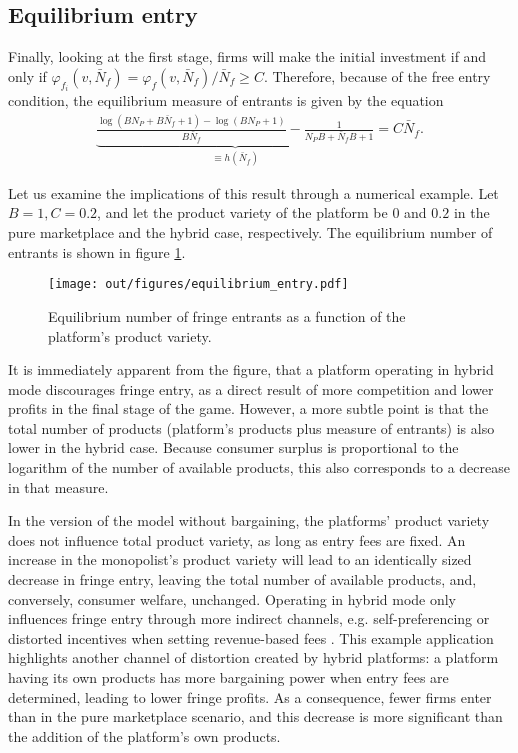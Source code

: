 \documentclass[a4paper]{article}
\begin{document}
\subsection{Equilibrium entry}

Finally, looking at the first stage, firms will make the initial investment if and only if $\varphi_{f_i}(v, \bar{N}_f) = \varphi_f(v, \bar{N}_f) / \bar{N}_f \geq C$. Therefore, because of the free entry condition, the equilibrium measure of entrants is given by the equation
\begin{align*}
    \underbrace{\frac{\log(BN_P + B\bar N_f + 1) - \log(BN_P + 1)}{B\bar N_f} - \frac{1}{N_P B + \bar N_f B + 1}}_{\equiv h(\bar N_f)} = C \bar{N}_f.
\end{align*}

Let us examine the implications of this result through a numerical example. Let $B=1, C=0.2$, and let the product variety of the platform be $0$ and $0.2$ in the pure marketplace and the hybrid case, respectively. The equilibrium number of entrants is shown in figure \ref{fig:entry}.
\begin{figure}
    \centering
    \texttt{[image: out/figures/equilibrium\_entry.pdf]}
    \caption{Equilibrium number of fringe entrants as a function of the platform's product variety.}
    \label{fig:entry}
\end{figure}

It is immediately apparent from the figure, that a platform operating in hybrid mode discourages fringe entry, as a direct result of more competition and lower profits in the final stage of the game. However, a more subtle point is that the total number of products (platform's products plus measure of entrants) is also lower in the hybrid case. Because consumer surplus is proportional to the logarithm of the number of available products, this also corresponds to a decrease in that measure.

 In the version of the model without bargaining, the platforms' product variety does not influence total product variety, as long as entry fees are fixed. An increase in the monopolist's product variety will lead to an identically sized decrease in fringe entry, leaving the total number of available products, and, conversely, consumer welfare, unchanged. Operating in hybrid mode only influences fringe entry through more indirect channels, e.g. self-preferencing \parencite[]{hagiu2022should} or distorted incentives when setting revenue-based fees \parencite[]{anderson2021hybrid}. This example application highlights another channel of distortion created by hybrid platforms: a platform having its own products has more bargaining power when entry fees are determined, leading to lower fringe profits. As a consequence, fewer firms enter than in the pure marketplace scenario, and this decrease is more significant than the addition of the platform's own products.
\end{document}
